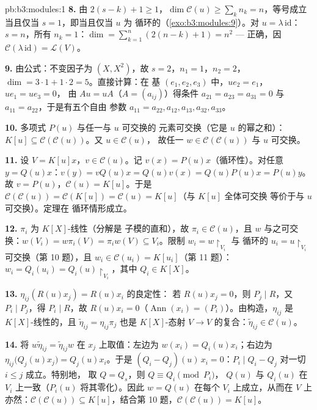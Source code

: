 \begin{solution}{pb:b3:modules:1}
\textbf{8.} 由 $2(s-k)+1 \geq 1$，$\dim\mathcal C(u) \geq
\sum_k n_k = n$，等号成立当且仅当 $s = 1$，即当且仅当 $u$ 为
循环的（\cref{exo:b3:modules:9}）。对 $u = \lambda\,\mathrm{id}$：
$s = n$，所有 $n_k = 1$：$\dim = \sum_{k=1}^n (2(n-k)+1) = n^2$
--- 正确，因 $\mathcal C(\lambda\,\mathrm{id}) = \mathcal
L(V)$。

\textbf{9.} 由公式：不变因子为 $(X, X^2)$，故 $s = 2$，$n_1 =
1$，$n_2 = 2$，$\dim = 3\cdot1 + 1\cdot2 = 5$。直接计算：在
基 $(e_1, e_2, e_3)$ 中，$u e_2 = e_1$，$ue_1 = ue_3 = 0$，
由 $Au = uA$（$A = (a_{ij})$）得条件
$a_{21} = a_{23} = a_{31} = 0$ 与 $a_{11} = a_{22}$，于是有五个自由
参数 $a_{11}{=}a_{22}, a_{12}, a_{13}, a_{32}, a_{33}$。

\textbf{10.} 多项式 $P(u)$ 与任一与 $u$ 可交换的
元素可交换（它是 $u$ 的幂之和）：$K[u]
\subseteq \mathcal C(\mathcal C(u))$。又 $u \in \mathcal C(u)$，
故任一 $w \in \mathcal C(\mathcal C(u))$ 与 $u$ 可交换。

\textbf{11.} 设 $V = K[u]x$，$v \in \mathcal C(u)$。记
$v(x) = P(u)x$（循环性）。对任意 $y = Q(u)x$：$v(y) =
vQ(u)x = Q(u)v(x) = Q(u)P(u)x = P(u)y$。故 $v = P(u)$，$\mathcal
C(u) = K[u]$。于是 $\mathcal C(\mathcal C(u)) = \mathcal
C(K[u]) = \mathcal C(u) = K[u]$（与 $K[u]$ 全体可交换
等价于与 $u$ 可交换）。定理在
循环情形成立。

\textbf{12.} $\pi_i$ 为 $K[X]$-线性（分解是
子模的直和），故 $\pi_i \in \mathcal C(u)$，且 $w$
与之可交换：$w(V_i) = w\pi_i(V) = \pi_i w(V) \subseteq
V_i$。限制 $w_i = w\restriction_{V_i}$ 与
循环的 $u_i = u\restriction_{V_i}$ 可交换（第 10 题），且 $w_i
\in \mathcal C(u_i) = K[u_i]$（第 11 题）：$w_i = Q_i(u_i) =
Q_i(u)\restriction_{V_i}$，其中 $Q_i \in K[X]$。

\textbf{13.} $\eta_{ij}(R(u)x_j) = R(u)x_i$ 的良定性：
若 $R(u)x_j = 0$，则 $P_j \mid R$，又 $P_i \mid P_j$，得
$P_i \mid R$，故 $R(u)x_i = 0$（$\operatorname{Ann}(x_i) =
(P_i)$）。由构造，$\eta_{ij}$ 是 $K[X]$-线性的，且
$\tilde\eta_{ij} = \eta_{ij}\pi_j$ 也是
$K[X]$-态射 $V \to V$ 的复合：$\tilde\eta_{ij} \in \mathcal
C(u)$。

\textbf{14.} 将 $w\tilde\eta_{ij} = \tilde\eta_{ij}w$ 在
$x_j$ 上取值：左边为 $w(x_i) = Q_i(u)x_i$；右边为
$\eta_{ij}\bigl(Q_j(u)x_j\bigr) = Q_j(u)x_i$。于是 $(Q_i -
Q_j)(u)\,x_i = 0$：$P_i \mid Q_i - Q_j$ 对一切 $i \leq j$ 成立。特别地，
取 $Q = Q_s$，则 $Q \equiv Q_i \pmod{P_i}$，
$Q(u)$ 与 $Q_i(u)$ 在 $V_i$ 上一致（$P_i(u)$ 将其零化）。因此 $w
= Q(u)$ 在每个 $V_i$ 上成立，从而在 $V$ 上亦然：$\mathcal C(\mathcal C(u))
\subseteq K[u]$，结合第 10 题，$\mathcal C(\mathcal
C(u)) = K[u]$。


\end{solution}

